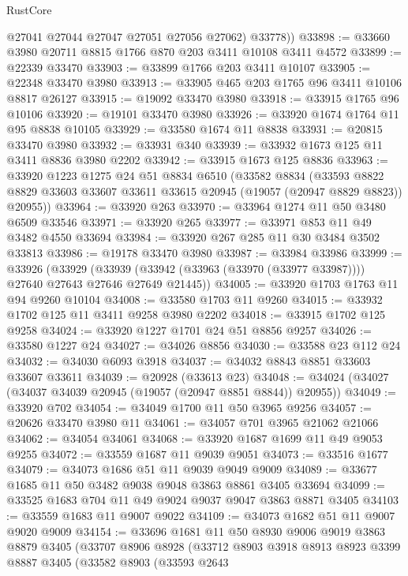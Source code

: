 \begin{lexlean}{RustCore}
\begin{coremodule}
          @27041
          @27044
          @27047
          @27051
          @27056
          @27062)
        @33778))
@33898 := @33660 @3980 @20711 @8815 @1766 @870 @203 @3411 @10108 @3411 @4572
@33899 := @22339 @33470
@33903 := @33899 @1766 @203 @3411 @10107
@33905 := @22348 @33470 @3980
@33913 := @33905 @465 @203 @1765 @96 @3411 @10106 @8817 @26127
@33915 := @19092 @33470 @3980
@33918 := @33915 @1765 @96 @10106
@33920 := @19101 @33470 @3980
@33926 := @33920 @1674 @1764 @11 @95 @8838 @10105
@33929 := @33580 @1674 @11 @8838
@33931 := @20815 @33470 @3980
@33932 := @33931 @340
@33939 := @33932 @1673 @125 @11 @3411 @8836 @3980 @2202
@33942 := @33915 @1673 @125 @8836
@33963 := @33920
    @1223
    @1275
    @24
    @51
    @8834
    @6510
    (@33582
      @8834
      (@33593 @8822 @8829 @33603 @33607 @33611 @33615 @20945 (@19057 (@20947 @8829 @8823)) @20955))
@33964 := @33920 @263
@33970 := @33964 @1274 @11 @50 @3480 @6509 @33546
@33971 := @33920 @265
@33977 := @33971 @853 @11 @49 @3482 @4550 @33694
@33984 := @33920 @267 @285 @11 @30 @3484 @3502 @33813
@33986 := @19178 @33470 @3980
@33987 := @33984 @33986
@33999 := @33926
    (@33929 (@33939 (@33942 (@33963 (@33970 (@33977 @33987)))) @27640 @27643 @27646 @27649 @21445))
@34005 := @33920 @1703 @1763 @11 @94 @9260 @10104
@34008 := @33580 @1703 @11 @9260
@34015 := @33932 @1702 @125 @11 @3411 @9258 @3980 @2202
@34018 := @33915 @1702 @125 @9258
@34024 := @33920 @1227 @1701 @24 @51 @8856 @9257
@34026 := @33580 @1227 @24
@34027 := @34026 @8856
@34030 := @33588 @23 @112 @24
@34032 := @34030 @6093 @3918
@34037 := @34032 @8843 @8851 @33603 @33607 @33611
@34039 := @20928 (@33613 @23)
@34048 := @34024 (@34027 (@34037 @34039 @20945 (@19057 (@20947 @8851 @8844)) @20955))
@34049 := @33920 @702
@34054 := @34049 @1700 @11 @50 @3965 @9256
@34057 := @20626 @33470 @3980 @11
@34061 := @34057 @701 @3965 @21062 @21066
@34062 := @34054 @34061
@34068 := @33920 @1687 @1699 @11 @49 @9053 @9255
@34072 := @33559 @1687 @11 @9039 @9051
@34073 := @33516 @1677
@34079 := @34073 @1686 @51 @11 @9039 @9049 @9009
@34089 := @33677 @1685 @11 @50 @3482 @9038 @9048 @3863 @8861 @3405 @33694
@34099 := @33525 @1683 @704 @11 @49 @9024 @9037 @9047 @3863 @8871 @3405
@34103 := @33559 @1683 @11 @9007 @9022
@34109 := @34073 @1682 @51 @11 @9007 @9020 @9009
@34154 := @33696
    @1681
    @11
    @50
    @8930
    @9006
    @9019
    @3863
    @8879
    @3405
    (@33707
      @8906
      @8928
      (@33712
        @8903
        @3918
        @8913
        @8923
        @3399
        @8887
        @3405
        (@33582
          @8903
          (@33593
            @2643

\end{coremodule}
\end{lexlean}
